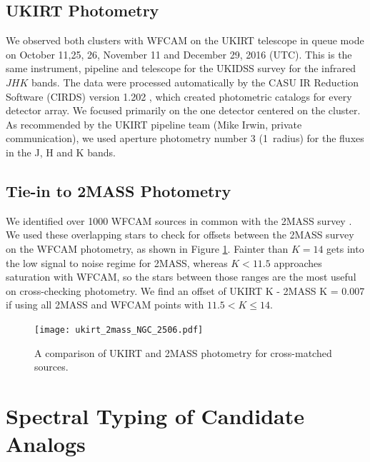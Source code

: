 \documentclass{aastex6}
\begin{document}
\subsection{UKIRT Photometry}

We observed both clusters with WFCAM on the UKIRT telescope in queue mode on October 11,25, 26, November 11 and December 29, 2016 (UTC).
This is the same instrument, pipeline and telescope for the UKIDSS survey for the infrared $JHK$ bands.
The data were processed automatically by the CASU IR Reduction Software (CIRDS) version 1.202 \citep{irwin2004vistaDataFlowWFCAM}, which created photometric catalogs for every detector array.
We focused primarily on the one detector centered on the cluster.
As recommended by the UKIRT pipeline team (Mike Irwin, private communication), we used aperture photometry number 3 (1\arcsec\ radius) for the fluxes in the J, H and K bands.

\subsection{Tie-in to 2MASS Photometry}

We identified over 1000 WFCAM sources in common with the 2MASS survey \citep{skrutskie06}.
We used these overlapping stars to check for offsets between the 2MASS survey on the WFCAM photometry, as shown in Figure \ref{fig:ukirtVs2MASS}.
Fainter than $K=14$ gets into the low signal to noise regime for 2MASS, whereas $K<11.5$ approaches saturation with WFCAM, so the stars between those ranges are the most useful on cross-checking photometry.
We find an offset of UKIRT K - 2MASS K = 0.007 if using all 2MASS and WFCAM points with $11.5 < K \le 14$.


\begin{figure}[!hbtp]
\centering
\texttt{[image: ukirt\_2mass\_NGC\_2506.pdf]}
\caption{A comparison of UKIRT and 2MASS photometry for cross-matched sources.}\label{fig:ukirtVs2MASS}
\end{figure}
%



\clearpage
\section{Spectral Typing of Candidate Analogs}
\end{document}
